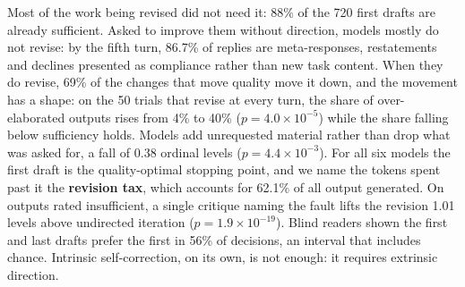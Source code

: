 Most of the work being revised did not need it: 88\% of the 720 first drafts are already
sufficient. Asked to improve them without direction, models mostly do not revise: by the
fifth turn, 86.7\% of replies are meta-responses, restatements and declines presented as
compliance rather than new task content. When they do revise, 69\% of the changes that move
quality move it down, and the movement has a shape: on the 50 trials that revise at every turn, the share of over-elaborated outputs rises from 4\% to 40\% ($p = 4.0 \times 10^{-5}$) while the share falling below sufficiency holds. Models add unrequested material rather than drop what was asked for, a fall of 0.38 ordinal levels ($p = 4.4 \times 10^{-3}$). For all six models the first draft is the quality-optimal stopping point, and we
name the tokens spent past it the \textbf{revision tax}, which accounts for 62.1\% of
all output generated. On outputs rated insufficient, a single critique naming the fault lifts the revision 1.01 levels above undirected iteration
($p = 1.9 \times 10^{-19}$). Blind readers shown the first and last drafts prefer the first
in 56\% of decisions, an interval that includes chance. Intrinsic self-correction, on its
own, is not enough: it requires extrinsic direction.

